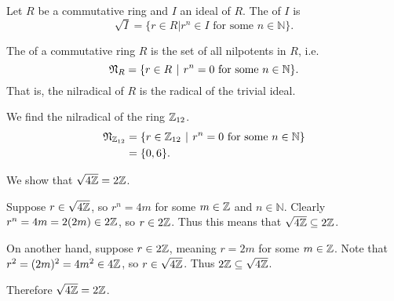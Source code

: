\pagebreak

\begin{definition}
    Let $R$ be a commutative ring and $I$ an ideal of $R$. The  of $I$ is
    \[
        \sqrt I = \{r \in R \vert r^n \in I \text{ for some } n \in \mathbb{N}\}.
    \]
\end{definition}
\begin{definition}
    The  of a commutative ring $R$ is the set of all nilpotents in $R$, i.e.
    \[
        \Nilr{R} = \{r \in R \vert r^n = 0 \text{ for some } n \in \mathbb{N}\}.
    \]
    That is, the nilradical of $R$ is the radical of the trivial ideal.
\end{definition}
\begin{example}
    We find the nilradical of the ring $\mathbb{Z}_{12}$.
    \begin{align*}
        \Nilr{\Z_{12}} &= \{r \in \Z_{12} \vert r^n = 0 \text{ for some } n \in \mathbb{N}\}\\
        &= \{0, 6\}.
    \end{align*}
\end{example}
\begin{example}
    We show that $\sqrt{4\mathbb{Z}} = 2\mathbb{Z}$.

    Suppose $r \in \sqrt{4\mathbb{Z}}$, so $r^n = 4m$ for some $m \in \mathbb{Z}$ and $n \in \mathbb{N}$. Clearly $r^n = 4m = 2(2m) \in 2\mathbb{Z}$, so $r \in 2\mathbb{Z}$. Thus this means that $\sqrt{4\mathbb{Z}} \subseteq 2\mathbb{Z}$.

    On another hand, suppose $r \in 2\mathbb{Z}$, meaning $r = 2m$ for some $m \in \mathbb{Z}$. Note that $r^2 = (2m)^2 = 4m^2 \in 4\mathbb{Z}$, so $r \in \sqrt{4\mathbb{Z}}$. Thus $2\mathbb{Z} \subseteq \sqrt{4\mathbb{Z}}$.

    Therefore $\sqrt{4\mathbb{Z}} = 2\mathbb{Z}$.
\end{example}

